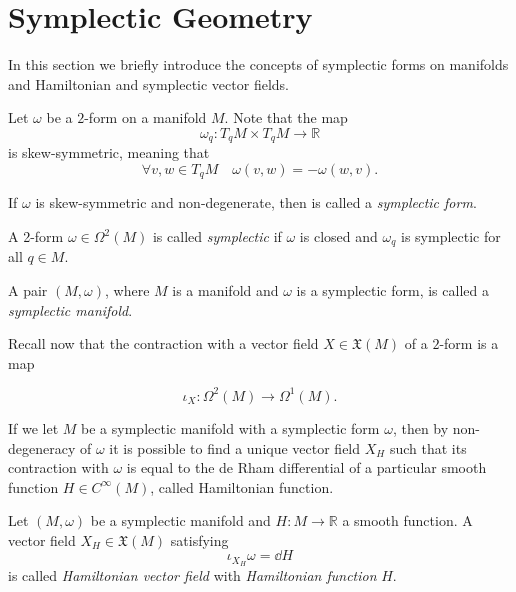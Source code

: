 \section{Symplectic Geometry}
\label{sec:symplectic_geom}

In this section we briefly introduce the concepts of symplectic forms on manifolds and Hamiltonian and symplectic vector fields.

Let $\omega$ be a $2$-form on a manifold $M$. Note that the map
\begin{equation*}
    \omega_q : T_q M \times T_q M \rightarrow \mathbb{R}
\end{equation*}
is skew-symmetric, meaning that
\begin{equation*}
    \forall v, w \in T_q M \quad \omega(v, w) = -\omega(w, v).
\end{equation*}

If $\omega$ is skew-symmetric and non-degenerate, then is called a \emph{symplectic form}.

\begin{definition}
    A 2-form $\omega \in \Omega^2(M)$ is called \emph{symplectic} if $\omega$ is closed and $\omega_q$ is symplectic for all $q \in M$.
\end{definition}

\begin{definition}
\label{def:sympl_mnf}
    A pair $(M, \omega)$, where $M$ is a manifold and $\omega$ is a symplectic form, is called a \emph{symplectic manifold}.
\end{definition}

Recall now that the contraction with a vector field $X \in \mathfrak{X}(M)$ of a $2$-form is a map

\begin{equation*}
    \iota_X : \Omega^2(M) \rightarrow \Omega^1(M).
\end{equation*}

If we let $M$ be a symplectic manifold with a symplectic form $\omega$, then by non-degeneracy of $\omega$ it is possible to find a unique vector field $X_H$ such that its contraction with $\omega$ is equal to the de Rham differential of a particular smooth function $H \in C^\infty(M)$, called Hamiltonian function.

\begin{definition}
    Let $(M, \omega)$ be a symplectic manifold and $H:M\rightarrow \mathbb{R}$ a smooth function.
    A vector field $X_H \in \mathfrak{X}(M)$ satisfying
    \begin{equation*}
        \iota_{X_H}\omega = \dd H
    \end{equation*}
    is called \emph{Hamiltonian vector field} with \emph{Hamiltonian function} $H$.
\end{definition}

